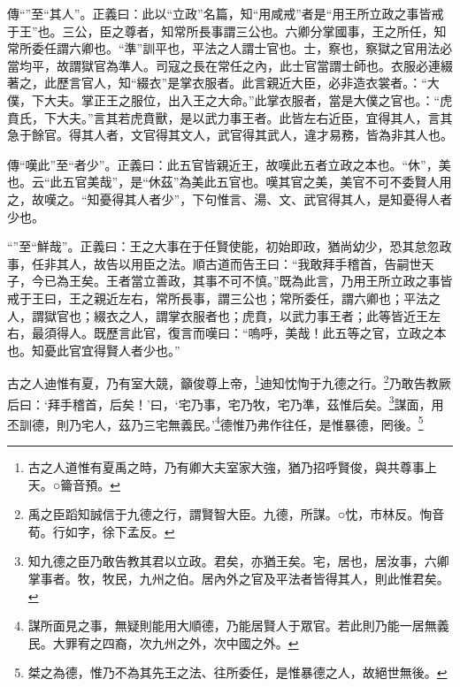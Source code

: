 {\noindent\zhuan{}\fzbyks 傳“”至“其人”。正義曰：此以“立政”名篇，知“用咸戒”者是“用王所立政之事皆戒于王”也。三公，臣之尊者，知常所長事謂三公也。六卿分掌國事，王之所任，知常所委任謂六卿也。“準”訓平也，平法之人謂士官也。士，察也，察獄之官用法必當均平，故謂獄官為準人。司寇之長在常任之內，此士官當謂士師也。衣服必連綴著之，此歷言官人，知“綴衣”是掌衣服者。此言親近大臣，必非造衣裳者。：“大僕，下大夫。掌正王之服位，出入王之大命。”此掌衣服者，當是大僕之官也。：“虎賁氏，下大夫。”言其若虎賁獸，是以武力事王者。此皆左右近臣，宜得其人，言其急于餘官。得其人者，文官得其文人，武官得其武人，違才易務，皆為非其人也。 \par}

{\noindent\zhuan{}\fzbyks 傳“嘆此”至“者少”。正義曰：此五官皆親近王，故嘆此五者立政之本也。“休”，美也。云“此五官美哉”，是“休茲”為美此五官也。嘆其官之美，美官不可不委賢人用之，故嘆之。“知憂得其人者少”，下句惟言、湯、文、武官得其人，是知憂得人者少也。 \par}

{\noindent\shu{}\fzkt “”至“鮮哉”。正義曰：王之大事在于任賢使能，初始即政，猶尚幼少，恐其怠忽政事，任非其人，故告以用臣之法。順古道而告王曰：“我敢拜手稽首，告嗣世天子，今已為王矣。王者當立善政，其事不可不慎。”既為此言，乃用王所立政之事皆戒于王曰，王之親近左右，常所長事，謂三公也；常所委任，謂六卿也；平法之人，謂獄官也；綴衣之人，謂掌衣服者也；虎賁，以武力事王者；此等皆近王左右，最須得人。既歷言此官，復言而嘆曰：“嗚呼，美哉！此五等之官，立政之本也。知憂此官宜得賢人者少也。” \par}

古之人迪惟有夏，乃有室大競，籲俊尊上帝，\footnote{古之人道惟有夏禹之時，乃有卿大夫室家大強，猶乃招呼賢俊，與共尊事上天。○籥音預。}迪知忱恂于九德之行。\footnote{禹之臣蹈知誠信于九德之行，謂賢智大臣。九德，所謀。○忱，市林反。恂音荀。行如字，徐下孟反。}乃敢告教厥后曰：‘拜手稽首，后矣！’曰，‘宅乃事，宅乃牧，宅乃準，茲惟后矣。\footnote{知九德之臣乃敢告教其君以立政。君矣，亦猶王矣。宅，居也，居汝事，六卿掌事者。牧，牧民，九州之伯。居內外之官及平法者皆得其人，則此惟君矣。}謀面，用丕訓德，則乃宅人，茲乃三宅無義民。’\footnote{謀所面見之事，無疑則能用大順德，乃能居賢人于眾官。若此則乃能一居無義民。大罪宥之四裔，次九州之外，次中國之外。}德惟乃弗作往任，是惟暴德，罔後。\footnote{桀之為德，惟乃不為其先王之法、往所委任，是惟暴德之人，故絕世無後。}


